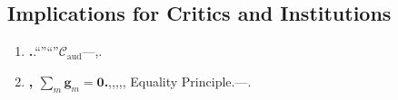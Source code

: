 \documentclass[12pt,a4paper]{article}
\theoremstyle{remark}
\newcommand{\AudCoord}{\mathcal{C}_{\text{aud}}}
\newcommand{\GParam}{\mathbf{g}}
\begin{document}
\subsection{}
\subsection{Implications for Critics and Institutions}
\begin{enumerate}[label=(\arabic*)]
 \item \textbf{.}.``''``''$\AudCoord$---,.
 \item \textbf{, $\sum_m \GParam_m = \mathbf{0}$.},,,,, Equality Principle.---.
\end{enumerate}
\subsection{}
\end{document}
